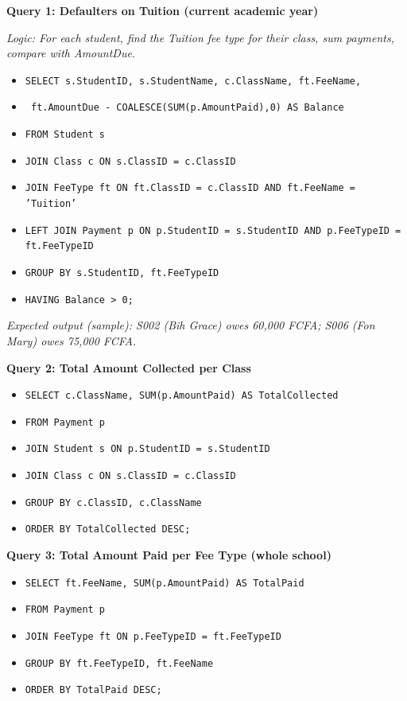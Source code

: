 \documentclass[11pt]{article}
\begin{document}
\begin{exoresolu}
\textbf{Query 1: Defaulters on Tuition (current academic year)}\par
\textit{Logic: For each student, find the Tuition fee type for their class, sum payments, compare with AmountDue.}
\begin{methode}[SQL]
\begin{itemize}
    \item \texttt{SELECT s.StudentID, s.StudentName, c.ClassName, ft.FeeName,}
    \item \texttt{       ft.AmountDue - COALESCE(SUM(p.AmountPaid),0) AS Balance}
    \item \texttt{FROM Student s}
    \item \texttt{JOIN Class c ON s.ClassID = c.ClassID}
    \item \texttt{JOIN FeeType ft ON ft.ClassID = c.ClassID AND ft.FeeName = 'Tuition'}
    \item \texttt{LEFT JOIN Payment p ON p.StudentID = s.StudentID AND p.FeeTypeID = ft.FeeTypeID}
    \item \texttt{GROUP BY s.StudentID, ft.FeeTypeID}
    \item \texttt{HAVING Balance > 0;}
\end{itemize}
\end{methode}
\textit{Expected output (sample): S002 (Bih Grace) owes 60,000 FCFA; S006 (Fon Mary) owes 75,000 FCFA.}

\textbf{Query 2: Total Amount Collected per Class}\par
\begin{methode}[SQL]
\begin{itemize}
    \item \texttt{SELECT c.ClassName, SUM(p.AmountPaid) AS TotalCollected}
    \item \texttt{FROM Payment p}
    \item \texttt{JOIN Student s ON p.StudentID = s.StudentID}
    \item \texttt{JOIN Class c ON s.ClassID = c.ClassID}
    \item \texttt{GROUP BY c.ClassID, c.ClassName}
    \item \texttt{ORDER BY TotalCollected DESC;}
\end{itemize}
\end{methode}

\textbf{Query 3: Total Amount Paid per Fee Type (whole school)}\par
\begin{methode}[SQL]
\begin{itemize}
    \item \texttt{SELECT ft.FeeName, SUM(p.AmountPaid) AS TotalPaid}
    \item \texttt{FROM Payment p}
    \item \texttt{JOIN FeeType ft ON p.FeeTypeID = ft.FeeTypeID}
    \item \texttt{GROUP BY ft.FeeTypeID, ft.FeeName}
    \item \texttt{ORDER BY TotalPaid DESC;}
\end{itemize}
\end{methode}


\end{exoresolu}
\end{document}
